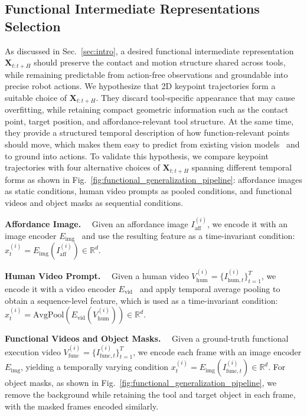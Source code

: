 \subsection{Functional Intermediate Representations Selection}
\label{sec:Functional Intermediate Representations Selection}
As discussed in Sec.~\ref{sec:intro}, a desired functional intermediate representation $\mathbf{X}_{t:t+H}$ should preserve the contact and motion structure shared across tools, while remaining predictable from action-free observations and groundable into precise robot actions. 
We hypothesize that 2D keypoint trajectories form a suitable choice of $\mathbf{X}_{t:t+H}$. 
They discard tool-specific appearance that may cause overfitting, while retaining compact geometric information such as the contact point, target position, and affordance-relevant tool structure. 
At the same time, they provide a structured temporal description of how function-relevant points should move, which makes them easy to predict from existing vision models~\citep{wen2023any} and to ground into actions. 
{To validate this hypothesis, we compare keypoint trajectories with four alternative choices of $\mathbf{X}_{t:t+H}$ spanning different temporal forms as shown in Fig.~\ref{fig:functional_generalization_pipeline}: affordance images as static conditions, human video prompts as pooled conditions, and functional videos and object masks as sequential conditions.}


\textbf{Affordance Image.}~~
Given an affordance image $I_{\mathrm{aff}}^{(i)}$, we encode it with an image encoder $E_{\mathrm{img}}$~\citep{he2016deep} and use the resulting feature as a time-invariant condition: $x_t^{(i)}=E_{\mathrm{img}}(I_{\mathrm{aff}}^{(i)})\in\mathbb{R}^{d}$.

\textbf{Human Video Prompt.}~~
Given a human video $V_{\mathrm{hum}}^{(i)}=\{I_{\mathrm{hum},t}^{(i)}\}_{t=1}^{T}$, we encode it with a video encoder $E_{\mathrm{vid}}$~\citep{bertasius2021space} and apply temporal average pooling to obtain a sequence-level feature, which is used as a time-invariant condition: $x_t^{(i)}=\mathrm{AvgPool}(E_{\mathrm{vid}}(V_{\mathrm{hum}}^{(i)}))\in\mathbb{R}^{d}$.

{\textbf{Functional Videos and Object Masks.}~~
Given a ground-truth functional execution video $V_{\mathrm{func}}^{(i)}=\{I_{\mathrm{func},t}^{(i)}\}_{t=1}^{T}$, we encode each frame with an image encoder $E_{\mathrm{img}}$, yielding a temporally varying condition $x_t^{(i)}=E_{\mathrm{img}}(I_{\mathrm{func},t}^{(i)})\in\mathbb{R}^{d}$. For object masks, as shown in Fig.~\ref{fig:functional_generalization_pipeline}, we remove the background while retaining the tool and target object in each frame, with the masked frames encoded similarly.}


